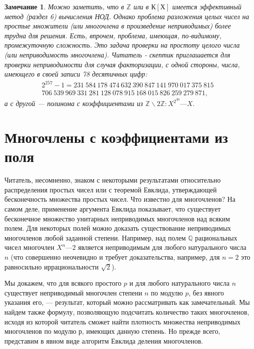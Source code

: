 \documentclass{mai_book}
\newtheorem{remark}{\textbf{Замечание}}
\begin{document}
\begin{center}
\begin{remark}
Можно заметить, что в $\mathbb{Z}$ или в $К[Х]$ имеется  
эффективный метод (раздел 6) вычисления НОД. Однако  
проблема разложения целых чисел на простые множители (или  
многочлена в произведение неприводимых) более трудна для решения. 
Есть, впрочем, проблема, имеющая, по-видимому,  
промежуточную сложность. Это задача проверки на простоту целого числа 
(или неприводимость многочлена). Читатель - скептик  
приглашается для проверки неприводимости для случая факторизации, 
с одной стороны, числа, имеющего в своей записи 78 десятичных 
цифр:
\begin{multline*}
2^{257} - 1 = 231\: 584\: 178\: 474\: 632\: 390\: 847\: 141\: 970\: 017\: 375\: 815\\ 
706\: 539\: 969\: 331\: 281\: 128\: 078\: 915\: 168\: 015\: 826\: 259\: 279\: 871,
\end{multline*} 
а с другой — полинома с коэффициентами из $\mathbb{Z}\backslash2\mathbb{Z} : X^{2^{30}} — X$. 
\end{remark}
\end{center}
\setcounter{thesection}{4}

\section{Многочлены с коэффициентами из поля}
Читатель, несомненно, знаком с некоторыми результатами  
относительно распределения простых чисел или с теоремой Евклида,  
утверждающей бесконечность множества простых чисел. Что известно для  
многочленов? На самом деле, применение аргумента Евклида  
показывает, что существует бесконечное множество унитарных неприводимых 
многочленов над всяким полем. Для некоторых полей можно доказать 
существование неприводимых многочленов любой заданной степени. 
Например, над полем $\mathbb{Q}$ рациональных чисел многочлен $X^n — 2$  
является неприводимым для любого натурального числа $n$ (что совершенно 
неочевидно и требует доказательства, например, для $n = 2$ это  
равносильно иррациональности $\sqrt{2}$). 

Мы докажем, что для всякого простого $p$ и для любого  
натурального числа $n$ существует неприводимый многочлен степени $n$ по модулю 
$p$, без явного указания его, — результат, который можно  
рассматривать как замечательный. Мы найдем также формулу, позволяющую 
подсчитать количество таких многочленов, исходя из которой  
читатель сможет найти плотность множества неприводимых многочленов 
по модулю р, имеющих данную степень. Но прежде всего, представим 
в явном виде алгоритм Евклида деления многочленов. 
\pagebreak
\setcounter{thesection}{4}
\end{document}
